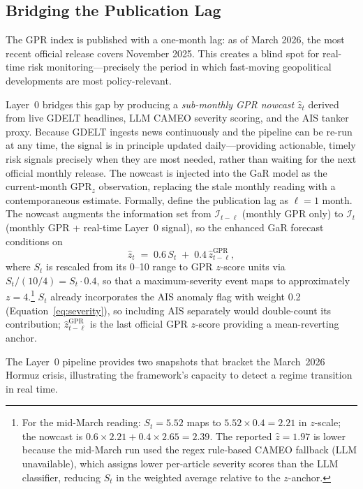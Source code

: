 \documentclass[12pt]{article}
\begin{document}
\subsection{Bridging the Publication Lag}
\label{sec:lag}

The GPR index is published with a one-month lag: as of March 2026, the
most recent official release covers November 2025.
This creates a blind spot for real-time risk monitoring---precisely the
period in which fast-moving geopolitical developments are most
policy-relevant.

Layer~0 bridges this gap by producing a \textit{sub-monthly GPR nowcast}
$\hat{z}_t$ derived from live GDELT headlines, LLM CAMEO severity scoring,
and the AIS tanker proxy.
Because GDELT ingests news continuously and the pipeline can be re-run
at any time, the signal is in principle updated daily---providing
actionable, timely risk signals precisely when they are most needed,
rather than waiting for the next official monthly release.
The nowcast is injected into the GaR model as the current-month
$\text{GPR}_z$ observation, replacing the stale monthly reading with a
contemporaneous estimate.
Formally, define the publication lag as $\ell = 1$ month.
The nowcast augments the information set from
$\mathcal{I}_{t-\ell}$ (monthly GPR only) to
$\mathcal{I}_t$ (monthly GPR + real-time Layer~0 signal),
so the enhanced GaR forecast conditions on
\begin{equation}
\hat{z}_t \;=\; 0.6\,S_t \;+\; 0.4\,\hat{z}^{\text{GPR}}_{t-\ell},
\label{eq:nowcast}
\end{equation}
where $S_t$ is rescaled from its 0--10 range to GPR $z$-score units
via $S_t / (10/4) = S_t \cdot 0.4$, so that a maximum-severity event
maps to approximately $z = 4$.\footnote{%
  For the mid-March reading: $S_t = 5.52$ maps to $5.52 \times 0.4 = 2.21$
  in $z$-scale; the nowcast is $0.6 \times 2.21 + 0.4 \times 2.65 = 2.39$.
  The reported $\hat{z} = 1.97$ is lower because the mid-March run used
  the regex rule-based CAMEO fallback (LLM unavailable), which assigns
  lower per-article severity scores than the LLM classifier, reducing $S_t$
  in the weighted average relative to the $z$-anchor.}
$S_t$ already incorporates the AIS anomaly flag with weight 0.2
(Equation~\ref{eq:severity}), so including AIS separately would
double-count its contribution; $\hat{z}^{\text{GPR}}_{t-\ell}$ is the
last official GPR $z$-score providing a mean-reverting anchor.

The Layer~0 pipeline provides two snapshots that bracket the March~2026
Hormuz crisis, illustrating the framework's capacity to detect a regime
transition in real time.
\end{document}
